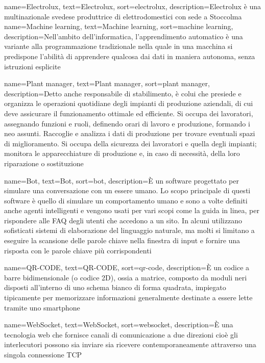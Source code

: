 {
	name={Electrolux},
	text=Electrolux,
	sort=electrolux,
	description={Electrolux è una multinazionale svedese produttrice di elettrodomestici con sede a Stoccolma}
}
{
	name={Machine learning},
	text=Machine learning,
	sort=machine learning,
	description={Nell'ambito dell'informatica, l'apprendimento automatico è una variante alla programmazione tradizionale nella quale in una macchina si predispone l'abilità di apprendere qualcosa dai dati in maniera autonoma, senza istruzioni esplicite}
}

{
	name={Plant manager},
	text=Plant manager,
	sort=plant manager,
	description={Detto anche responsabile di stabilimento, è colui che presiede e organizza le operazioni quotidiane degli impianti di produzione aziendali, di cui deve assicurare il funzionamento ottimale ed efficiente. Si occupa dei lavoratori, assegnando funzioni e ruoli, definendo orari di lavoro e produzione, formando i neo assunti. Raccoglie e analizza i dati di produzione per trovare eventuali spazi di miglioramento. Si occupa della sicurezza dei lavoratori e quella degli impianti; monitora le apparecchiature di produzione e, in caso di necessità, della loro riparazione o sostituzione}
}

{
	name={Bot},
	text=Bot,
	sort=bot,
	description={È un software progettato per simulare una conversazione con un essere umano. Lo scopo principale di questi software è quello di simulare un comportamento umano e sono a volte definiti anche agenti intelligenti e vengono usati per vari scopi come la guida in linea, per rispondere alle FAQ degli utenti che accedono a un sito. In alcuni utilizzano sofisticati sistemi di elaborazione del linguaggio naturale, ma molti si limitano a eseguire la scansione delle parole chiave nella finestra di input e fornire una risposta con le parole chiave più corrispondenti}
}

{
	name={QR-CODE},
	text=QR-CODE,
	sort=qr-code,
	description={È un codice a barre bidimensionale (o codice 2D), ossia a matrice, composto da moduli neri disposti all'interno di uno schema bianco di forma quadrata, impiegato tipicamente per memorizzare informazioni generalmente destinate a essere lette tramite uno smartphone}
}

{
	name={WebSocket},
	text=WebSocket,
	sort=websocket,
	description={È una tecnologia web che fornisce canali di comunicazione a due direzioni cioè gli interlecutori possono sia inviare sia ricevere contemporaneamente attraverso una singola connessione TCP}
}

